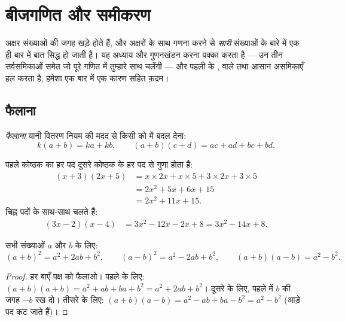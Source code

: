 \chapter{बीजगणित और समीकरण}\label{ch:g9:algebra}

अक्षर संख्याओं की जगह खड़े होते हैं, और अक्षरों के साथ गणना करने से
\emph{सारी} संख्याओं के बारे में एक ही बार में बात सिद्ध हो जाती है।
यह अध्याय  और गुणनखंडन करना पक्का करता है --- उन तीन
सर्वसमिकाओं समेत जो पूरे गणित में तुम्हारे साथ चलेंगी --- और पहली 
के ,  वाले  तथा आसान असमिकाएँ हल करता है, हमेशा एक
बार में एक कारण सहित क़दम।

\section{फैलाना}

\begin{definition}[फैलाना]\label{def:g9:algebra:expand}
\emph{फैलाना} यानी वितरण नियम की मदद से किसी  को
 में बदल देना:
\[
k(a + b) = ka + kb,
\qquad
(a + b)(c + d) = ac + ad + bc + bd .
\]
\end{definition}

\begin{example}\label{ex:g9:algebra:expand}
पहले कोष्ठक का हर पद दूसरे कोष्ठक के हर पद से गुणा होता है:
\begin{align*}
(x + 3)(2x + 5)
&= x \times 2x + x \times 5 + 3 \times 2x + 3 \times 5 \\
&= 2x^2 + 5x + 6x + 15 \\
&= 2x^2 + 11x + 15 .
\end{align*}
चिह्न पदों के साथ-साथ चलते हैं:
\begin{align*}
(3x - 2)(x - 4)
&= 3x^2 - 12x - 2x + 8
= 3x^2 - 14x + 8 .
\end{align*}
\end{example}

\begin{theorem}[तीन उल्लेखनीय सर्वसमिकाएँ]\label{thm:g9:algebra:identities}
सभी संख्याओं $a$ और $b$ के लिए:
\[
(a+b)^2 = a^2 + 2ab + b^2,
\qquad
(a-b)^2 = a^2 - 2ab + b^2,
\qquad
(a+b)(a-b) = a^2 - b^2 .
\]
\end{theorem}

\begin{proof}
हर बाएँ पक्ष को फैलाओ। पहले के लिए:
$(a+b)(a+b) = a^2 + ab + ba + b^2 = a^2 + 2ab + b^2$। दूसरे के लिए,
पहले में $b$ की जगह $-b$ रख दो। तीसरे के लिए:
$(a+b)(a-b) = a^2 - ab + ba - b^2 = a^2 - b^2$ (आड़े पद कट जाते हैं)।
\end{proof}

